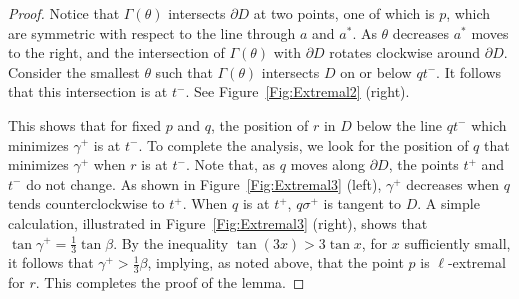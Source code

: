 \documentclass[letter,11pt]{article}
\def\bd{{\partial}}
\begin{document}
\begin{proof}
Notice that $\Gamma(\theta)$ intersects $\bd D$ at two points, one of which is $p$, which
are symmetric with respect to the line 
through $a$ and $a^*$.  As $\theta$ decreases
$a^*$ moves to the right, and the intersection of $\Gamma(\theta)$
with $\bd D$ rotates clockwise around $\bd D$.
Consider the smallest $\theta$ such that $\Gamma(\theta)$ intersects $D$ on or below  $qt^{-}$. It follows that this intersection is at $t^-$.
 See Figure~\ref{Fig:Extremal2} (right).


This shows that
for  fixed  $p$ and $q$, the position of $r$
in $D$ below the line $qt^{-}$ which minimizes $\gamma^+$ is at
$t^{-}$. 
To complete the analysis, we look for the position of $q$ that minimizes $\gamma^+$ when
$r$ is at $t^{-}$. 
Note that, as $q$ moves along $\partial D$, the points $t^+$ and $t^-$ do not change.
As shown in Figure~\ref{Fig:Extremal3} (left),
 $\gamma^+$ decreases when 
 $q$ tends counterclockwise to $t^+$.
When $q$ is at $t^{+}$,
 $q\sigma^+$ is tangent to $D$.
A simple calculation, 
 illustrated in Figure~\ref{Fig:Extremal3} (right), shows that
 $\tan\gamma^+ = \frac13 \tan \beta$. By the
 inequality $\tan (3x) > 3\tan x$, for $x$ sufficiently small, it follows that $\gamma^+ >
 \frac{1}{3}\beta$, implying, as noted above, that the point $p$ is $\ell$-extremal 
 for $r$. This completes the proof of the lemma.
\end{proof}
\end{document}
